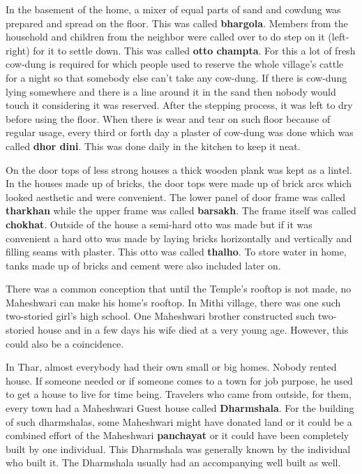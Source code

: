 In the basement of the home, a mixer of equal parts of sand and cowdung was
prepared and spread on the floor. This was called \textbf{bhargola}. Members
from the household and children from the neighbor were called over to do step on
it (left-right) for it to settle down. This was called \textbf{otto champta}.
For this a lot of fresh cow-dung is required for which people used to reserve the
whole village's cattle for a night so that somebody else can't take any
cow-dung. If there is cow-dung lying somewhere and there is a line around it in
the sand then nobody would touch it considering it was reserved. After the
stepping process, it was left to dry before using the floor. When there is wear
and tear on such floor because of regular usage, every third or forth day a
plaster of cow-dung was done which was called \textbf{dhor dini}. This was done
daily in the kitchen to keep it neat.

On the door tops of less strong houses a thick wooden plank was kept as a lintel.
In the houses made up of bricks, the door tops were made up of brick arcs which
looked aesthetic and were convenient. The lower panel of door frame was called
\textbf{tharkhan} while the upper frame was called \textbf{barsakh}. The frame
itself was called \textbf{chokhat}. Outside of the house a semi-hard otto was
made but if it was convenient a hard otto was made by laying bricks horizontally
and vertically and filling seams with plaster. This otto was called
\textbf{thalho}. To store water in home, tanks made up of bricks and cement were
also included later on.

There was a common conception that until the Temple's rooftop is not made, no
Maheshwari can make his home's rooftop. In Mithi village, there was one such
two-storied girl's high school. One Maheshwari brother constructed such
two-storied house and in a few days his wife died at a very young age. However,
this could also be a coincidence.

In Thar, almost everybody had their own small or big homes. Nobody rented house.
If someone needed or if someone comes to a town for job purpose, he used to get
a house to live for time being. Travelers who came from outside, for them, every
town had a Maheshwari Guest house called \textbf{Dharmshala}. For the building
of such dharmshalas, some Maheshwari might have donated land or it could be a
combined effort of the Maheshwari \textbf{panchayat} or it could have been
completely built by one individual. This Dharmshala was generally known by the
individual who built it. The Dharmshala usually had an accompanying well built
as well. 

